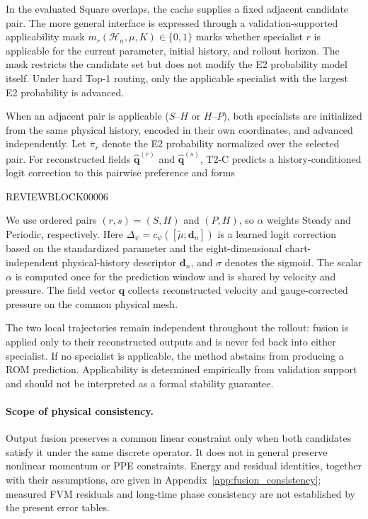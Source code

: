 \documentclass{article}
\begin{document}
In the evaluated Square overlaps, the cache supplies a fixed adjacent candidate pair. The more general interface is expressed through a validation-supported applicability mask $m_r(\mathcal H_n,\mu,K)\in\{0,1\}$ marks whether specialist $r$ is applicable for the current parameter, initial history, and rollout horizon. The mask restricts the candidate set but does not modify the E2 probability
model itself. Under hard Top-1 routing, only the applicable specialist with the largest E2 probability is advanced.

When an adjacent pair is applicable ($S$--$H$ or $H$--$P$), both specialists are initialized from the same physical history, encoded in
their own coordinates, and advanced independently. Let $\bar\pi_r$ denote the E2 probability normalized over the selected pair. For reconstructed fields $\widehat{\bm q}^{(r)}$ and $\widehat{\bm q}^{(s)}$, T2-C predicts a history-conditioned logit correction to this pairwise preference and forms


REVIEWBLOCK00006


We use ordered pairs $(r,s)=(S,H)$ and $(P,H)$, so $\alpha$ weights Steady and Periodic, respectively. Here $\Delta_\psi=c_\psi([\widetilde\mu;\bm d_n])$ is a learned logit correction based on the standardized parameter and the eight-dimensional chart-independent physical-history descriptor $\bm d_n$, and $\sigma$ denotes the sigmoid. The scalar $\alpha$ is computed once for the prediction window and is shared by velocity and pressure. The field vector $\bm q$ collects reconstructed velocity and gauge-corrected pressure on the common physical mesh.

The two local trajectories remain independent throughout the rollout: fusion is applied only to their reconstructed outputs and is never fed back into either specialist. If no specialist is applicable, the method abstains from producing a ROM prediction. Applicability is determined empirically from validation support and should not be interpreted as a formal stability guarantee.


\paragraph{Scope of physical consistency.}
Output fusion preserves a common linear constraint only when both
candidates satisfy it under the same discrete operator. It does not in
general preserve nonlinear momentum or PPE constraints. Energy and
residual identities, together with their assumptions, are given in
Appendix~\ref{app:fusion_consistency}; measured FVM residuals and long-time
phase consistency are not established by the present error tables.
\end{document}
